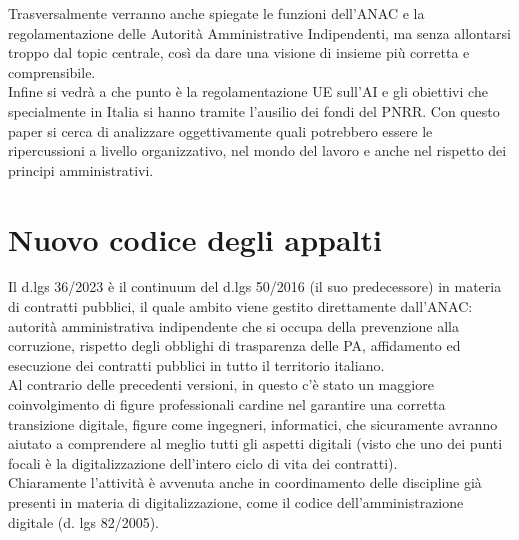 \documentclass{article}
\begin{document}
\begin{justify}
Trasversalmente verranno anche spiegate le funzioni dell'ANAC e la regolamentazione delle Autorità Amministrative Indipendenti, ma senza allontarsi troppo dal topic centrale, così da dare una visione di insieme più corretta e comprensibile.\\
Infine si vedrà a che punto è la regolamentazione UE sull'AI e gli obiettivi che specialmente in Italia si hanno tramite l'ausilio dei fondi del PNRR.
Con questo paper si cerca di analizzare oggettivamente quali potrebbero essere le ripercussioni a livello organizzativo, nel mondo del lavoro e anche nel rispetto dei principi amministrativi.
\end{justify}

\centering
\section{Nuovo codice degli appalti}
\begin{justify}
    Il d.lgs 36/2023 è il continuum del d.lgs 50/2016 (il suo predecessore) in materia di contratti pubblici, il quale ambito viene gestito direttamente dall'ANAC: autorità amministrativa indipendente che si occupa della prevenzione alla corruzione, rispetto degli obblighi di trasparenza delle PA, affidamento ed esecuzione dei contratti pubblici in tutto il territorio italiano.\citep{AnacSite}\\
    Al contrario delle precedenti versioni, in questo c'è stato un maggiore coinvolgimento di figure professionali cardine nel garantire una corretta transizione digitale, figure come ingegneri, informatici, che sicuramente avranno aiutato a comprendere al meglio tutti gli aspetti digitali (visto che uno dei punti focali è la digitalizzazione dell'intero ciclo di vita dei contratti).\\
    Chiaramente l'attività è avvenuta anche in coordinamento delle discipline già presenti in materia di digitalizzazione, come il codice dell'amministrazione digitale (d. lgs 82/2005).
\end{justify}
\end{document}
